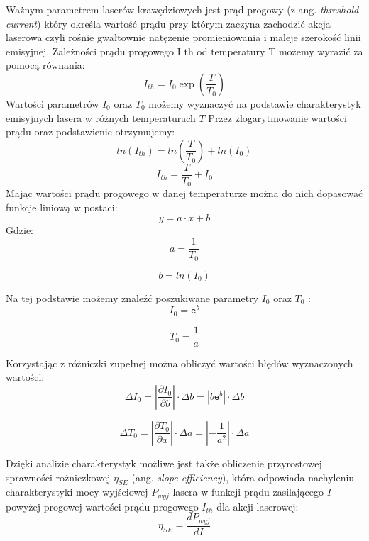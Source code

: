 \documentclass[a4paper, portrait,12pt]{report}
\begin{document}
Ważnym parametrem laserów krawędziowych jest prąd progowy (z ang. \textit{threshold
current}) który określa wartość prądu przy którym zaczyna zachodzić akcja laserowa czyli
rośnie gwałtownie natężenie promieniowania i maleje szerokość linii emisyjnej.
Zależności prądu progowego I th od temperatury T możemy wyrazić za pomocą równania:
\begin{equation}
I_{th} = I_0 \exp \left( \frac{T}{T_0} \right)
\end{equation}
Wartości parametrów $I_0$ oraz $T_0$ możemy wyznaczyć na podstawie charakterystyk
emisyjnych lasera w różnych temperaturach $T$
Przez zlogarytmowanie wartości prądu oraz podstawienie otrzymujemy:
\begin{equation}
ln(I_{th}) =   ln \left(\frac{T}{T_0} \right) + ln(I_0)
\end{equation}
\begin{equation}
I_{th} = \frac{T}{T_0} + I_0
\end{equation}
Mając wartości prądu progowego w danej temperaturze  można do nich dopasować funkcje liniową w postaci:
\begin{equation}
y = a \cdot x + b
\end{equation}
Gdzie:
\begin{equation}
a = \frac{1}{T_0}
\end{equation}

\begin{equation}
b = ln(I_0)
\end{equation}

Na tej podstawie możemy znaleźć poszukiwane parametry $I_0$ oraz $T_0$ :
\begin{equation}
I_0 = \mathtt{e}^b
\end{equation}

\begin{equation}
T_0 = \frac{1}{a}
\end{equation}

Korzystając z różniczki zupełnej można obliczyć wartości błędów wyznaczonych wartości:
\begin{equation}
\Delta I_0 = | \frac{\partial I_{0}}{\partial b} | \cdot \Delta b = | b \mathtt{e}^b | \cdot \Delta b
\end{equation}

\begin{equation}
\Delta T_0 = | \frac{\partial T_{0}}{\partial a} | \cdot \Delta a = |-\frac{1}{a^2} | \cdot \Delta a
\end{equation}

Dzięki analizie charakterystyk możliwe jest także obliczenie przyrostowej sprawności rożniczkowej
 $\eta_{SE}$ (ang. \textit{slope efficiency}), która odpowiada nachyleniu charakterystyki mocy wyjściowej $P_{wyj}$ lasera w funkcji prądu zasilającego $I$ powyżej progowej wartości prądu progowego $I_{th}$ dla akcji laserowej:
 \begin{equation}
 \eta_{SE} = \frac{d P_{wyj}}{d I}
 \end{equation}
\end{document}
